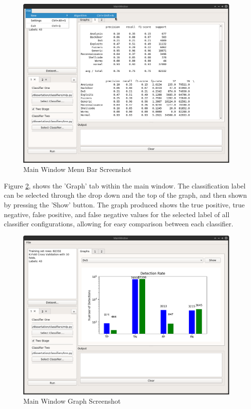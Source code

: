 \documentclass[12pt,a4paper]{article}
\begin{document}
\begin{figure}[H]
	\centering
	\includegraphics[trim={0cm 15cm 15cm 0},clip,width=1.0\textwidth]{figures/menubarscreenshot}
	\caption{Main Window Menu Bar Screenshot}
	\label{mwmbs}
\end{figure}
Figure \ref{mws}, shows the 'Graph' tab within the main window. The classification label can be selected through the drop down and the top of the graph, and then shown by pressing the 'Show' button. The graph produced shows the true positive, true negative, false positive, and false negative values for the selected label of all classifier configurations, allowing for easy comparison between each classifier.
\begin{figure}[H]
	\centering
	\includegraphics[width=1.0\textwidth]{figures/mainwindowscreenshot}
	\caption{Main Window Graph Screenshot}
	\label{mws}
\end{figure}
\end{document}
